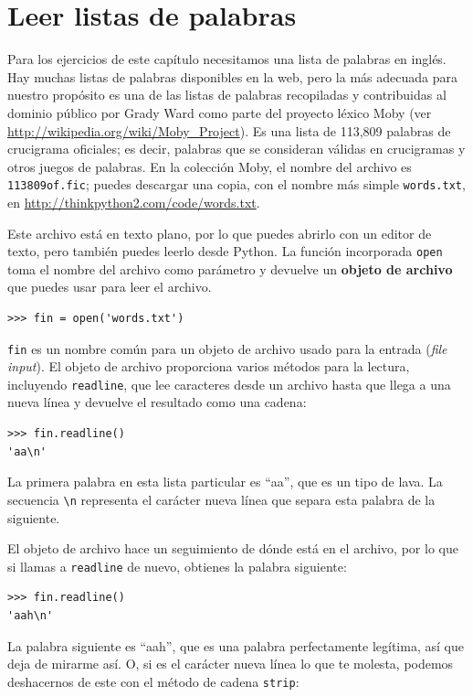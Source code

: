\documentclass[10pt]{book}
\begin{document}
\section{Leer listas de palabras}
\label{wordlist}

Para los ejercicios de este capítulo necesitamos una lista de palabras en inglés.
Hay muchas listas de palabras disponibles en la web, pero la más
adecuada para nuestro propósito es una de las listas de palabras recopiladas y
contribuidas al dominio público por Grady Ward como parte del proyecto léxico Moby
(ver \url{http://wikipedia.org/wiki/Moby_Project}).  Es
una lista de 113,809 palabras de crucigrama oficiales; es decir, palabras que se
consideran válidas en crucigramas y otros juegos de palabras.  En la
colección Moby, el nombre del archivo es {\tt 113809of.fic}; puedes descargar
una copia, con el nombre más simple {\tt words.txt}, en
\url{http://thinkpython2.com/code/words.txt}.

Este archivo está en texto plano, por lo que puedes abrirlo con un editor
de texto, pero también puedes leerlo desde Python.  La función incorporada
{\tt open} toma el nombre del archivo como parámetro
y devuelve un {\bf objeto de archivo} que puedes usar para leer el archivo.

\begin{verbatim}
>>> fin = open('words.txt')
\end{verbatim}
%
{\tt fin} es un nombre común para un objeto de archivo usado para la entrada ({\em file input}).  El objeto
de archivo proporciona varios métodos para la lectura, incluyendo {\tt readline},
que lee caracteres desde un archivo hasta que llega a una nueva línea y
devuelve el resultado como una cadena: 

\begin{verbatim}
>>> fin.readline()
'aa\n'
\end{verbatim}
%
La primera palabra en esta lista particular es ``aa'', que es un tipo de
lava.  La secuencia \verb"\n" representa el carácter nueva línea que
separa esta palabra de la siguiente.

El objeto de archivo hace un seguimiento de dónde está en el archivo, por lo que
si llamas a {\tt readline} de nuevo, obtienes la palabra siguiente:

\begin{verbatim}
>>> fin.readline()
'aah\n'
\end{verbatim}
%
La palabra siguiente es ``aah'', que es una palabra perfectamente legítima,
así que deja de mirarme así.
O, si es el carácter nueva línea lo que te molesta,
podemos deshacernos de este con el método de cadena {\tt strip}:
\end{document}
